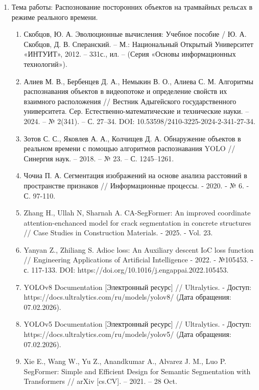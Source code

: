 \documentclass[areasetadvanced]{scrartcl}
\begin{document}
\begin{enumerate}[label=\arabic*., ref=\arabic*]
    \item Тема работы: \guillemotleft Распознование посторонних объектов на трамвайных рельсах в режиме реального времени.\guillemotright
    \begin{enumerate}[label=\arabic{enumi}.\arabic*., ref=\arabic{enumi}.\arabic*]
        \item Скобцов, Ю. А. Эволюционные вычисления: Учебное пособие / Ю. А. Скобцов, Д. В. Сперанский. – М.: Национальный Открытый Университет «ИНТУИТ», 2012. – 331с., ил. – (Серия «Основы информационных технологий»).
        \item Алиев М. В., Бербенцев Д. А., Немыкин В. О., Алиева С. М. Алгоритмы распознавания объектов в видеопотоке и определение свойств их взаимного расположения // Вестник Адыгейского государственного университета. Сер. Естественно-математические и технические науки. – 2024. – № 2(341). – С. 27–34. DOI: 10.53598/2410-3225-2024-2-341-27-34.
        \item Зотов С. С., Яковлев А. А., Колчищев Д. А. Обнаружение объектов в реальном времени с помощью алгоритмов распознавания YOLO // Синергия наук. – 2018. – № 23. – С. 1245–1261.
        \item Чочиа П. А. Сегментация изображений на основе анализа расстояний в пространстве признаков // Информационные процессы. - 2020. - № 6. - С. 97-110.
        \item Zhang H., Ullah N, Sharnah A. CA-SegFormer: An improved coordinate attention-enchanced model for crack segmentation in concrete structures // Case Studies in Construction Materials. - 2025. - Vol. 23.
        \item Yanyan Z., Zhiliang S. Adioc loss: An Auxiliary descent IoC loss function // Engineering Applications of Artificial Intelligence - 2022. - №105453. - с. 117-133. DOI: https://doi.org/10.1016/j.engappai.2022.105453.
        \item YOLOv8 Documentation [Электронный ресурс] // Ultralytics. - Доступ: https://docs.ultralytics.com/ru/models/yolov8/ (Дата обращения: 07.02.2026).
        \item YOLOv5 Documentation [Электронный ресурс] // Ultralytics. - Доступ: https://docs.ultralytics.com/ru/models/yolov5/ (Дата обращения: 07.02.2026).
        \item Xie E., Wang W., Yu Z., Anandkumar A., Alvarez J. M., Luo P. SegFormer: Simple and Efficient Design for Semantic Segmentation with Transformers // arXiv [cs.CV]. – 2021. – 28 Oct.

\end{enumerate}
\end{enumerate}
\end{document}
